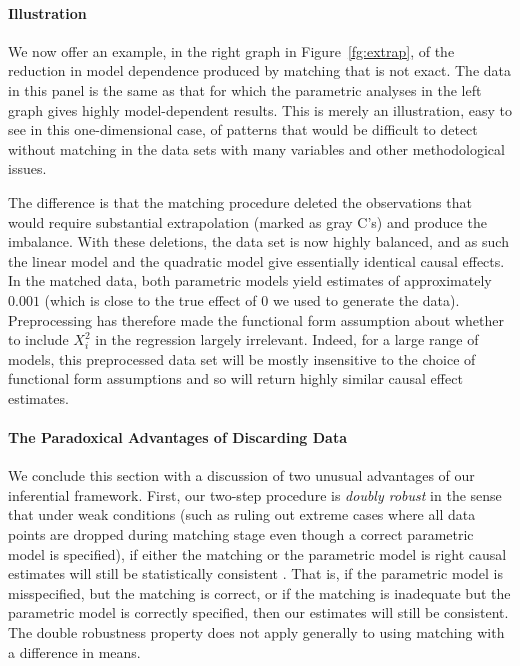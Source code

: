 \documentclass[11pt,titlepage]{article}
\begin{document}
\paragraph{Illustration}
We now offer an example, in the right graph in Figure~\ref{fg:extrap},
of the reduction in model dependence produced by matching that is not
exact.  The data in this panel is the same as that for which the
parametric analyses in the left graph gives highly model-dependent
results.  This is merely an illustration, easy to see in this
one-dimensional case, of patterns that would be difficult to detect
without matching in the data sets with many variables and other
methodological issues.

The difference is that the matching procedure deleted the observations
that would require substantial extrapolation (marked as gray C's) and
produce the imbalance.  With these deletions, the data set is now highly
balanced, and as such the linear model and the quadratic model give
essentially identical causal effects.  In the matched data, both
parametric models yield estimates of approximately $0.001$ (which is
close to the true effect of $0$ we used to generate the data).
Preprocessing has therefore made the functional form assumption about
whether to include $X_i^2$ in the regression largely irrelevant.
Indeed, for a large range of models, this preprocessed data set will
be mostly insensitive to the choice of functional form assumptions and
so will return highly similar causal effect estimates.

\paragraph{The Paradoxical Advantages of Discarding Data}
We conclude this section with a discussion of two unusual advantages
of our inferential framework.  First, our two-step procedure is
\emph{doubly robust} in the sense that under weak conditions (such as
ruling out extreme cases where all data points are dropped during matching
stage even though a correct parametric model is specified), if either
the matching or the parametric model is right causal estimates will
still be statistically consistent \citep[see][]{RobRot01}.  That is,
if the parametric model is misspecified, but the matching is correct,
or if the matching is inadequate but the parametric model is correctly
specified, then our estimates will still be consistent.  The double
robustness property does not apply generally to using matching with a
difference in means.
\end{document}
